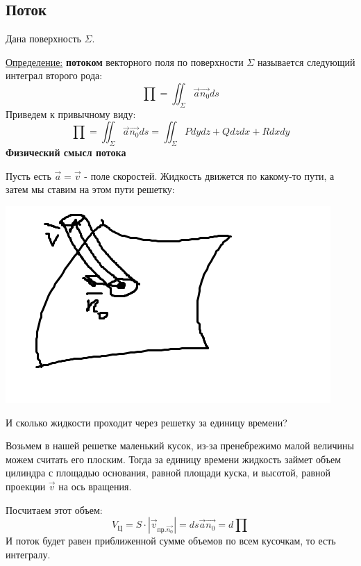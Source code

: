 \documentclass[12pt]{article}
\begin{document}
\subsection{Поток}
Дана поверхность $\Sigma$.\par
\uline{Определение:} \textbf{потоком} векторного поля по поверхности $\Sigma$ называется следующий интеграл второго рода:
$$\prod = \iint_{\Sigma} \overrightarrow{a} \overrightarrow{n_0} ds$$
Приведем к привычному виду:
$$\prod = \iint_{\Sigma} \overrightarrow{a} \overrightarrow{n_0} ds = \iint_{\Sigma} Pdydz + Qdzdx + Rdxdy$$
\textbf{Физический смысл потока}\par
Пусть есть $\overrightarrow{a} = \overrightarrow{v}$ - поле скоростей. Жидкость движется по какому-то пути, а затем мы ставим на этом пути решетку:\par
\includegraphics{currentPhysicDefinition}\par
И сколько жидкости проходит через решетку за единицу времени?\par
Возьмем в нашей решетке маленький кусок, из-за пренебрежимо малой величины можем считать его плоским. Тогда за единицу времени жидкость займет объем цилиндра с площадью основания, равной площади куска, и высотой, равной проекции $\overrightarrow{v}$ на ось вращения.\par
Посчитаем этот объем:
$$V_{\text{Ц}} = S \cdot |\overrightarrow{v}_{\text{пр.} \overrightarrow{n_0}}| = ds \overrightarrow{a} \overrightarrow{n_0} = d\prod$$
И поток будет равен приближенной сумме объемов по всем кусочкам, то есть интегралу.\par
\end{document}

